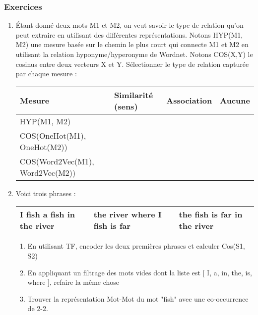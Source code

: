 \documentclass{KodeBook}
\begin{document}


\subsubsection*{Exercices}

\begin{enumerate}
	\item Étant donné deux mots M1 et M2, on veut savoir le type de relation qu'on peut extraire en utilisant des différentes représentations.   Notons HYP(M1, M2) une mesure basée sur le chemin le plus  court qui connecte M1 et M2 en utilisant la relation hyponyme/hyperonyme de Wordnet. Notons COS(X,Y) le cosinus entre deux vecteurs X et Y. Sélectionner le type de relation capturée par chaque mesure :
	
	\begin{tabular}{|llll|}
		\hline 
		Mesure & Similarité (sens) & Association & Aucune\\
		\hline
		HYP(M1, M2) & \Square & \Square & \Square \\
		COS(OneHot(M1), OneHot(M2)) & \Square & \Square & \Square \\
		COS(Word2Vec(M1), Word2Vec(M2)) & \Square & \Square & \Square \\
		\hline
	\end{tabular}

	\item Voici trois phrases : 
	
	\begin{tabular}{|lll|}
		\hline 
		I fish a fish in the river & the river where I fish is far & the fish is far in the river\\
		\hline
	\end{tabular}

	\begin{enumerate}
		\item En utilisant TF, encoder les deux premières phrases et calculer Cos(S1, S2) 
		\item En appliquant un filtrage des mots vides dont la liste est [ I, a, in, the, is, where ], refaire la même chose
		\item Trouver la représentation Mot-Mot du mot "fish" avec une co-occurrence de 2-2.
	\end{enumerate}

	
\end{enumerate}
\end{document}
